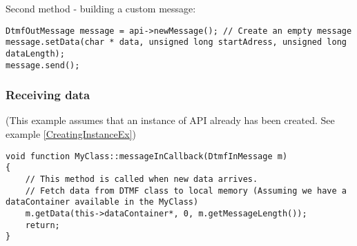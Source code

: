 Second method - building a custom message:
\begin{lstlisting}[float=htb,language={[ANSI]C++},caption={Sending data example 2},label=SendingDataEx2]
DtmfOutMessage message = api->newMessage(); // Create an empty message
message.setData(char * data, unsigned long startAdress, unsigned long dataLength);
message.send();
\end{lstlisting}

\subsubsection{Receiving data}
(This example assumes that an instance of API already has been created. See example \ref{CreatingInstanceEx})
\begin{lstlisting}[float=htb,language={[ANSI]C++},caption={Receiving data example},label=ReceivingDataEx]
void function MyClass::messageInCallback(DtmfInMessage m)
{
    // This method is called when new data arrives.
    // Fetch data from DTMF class to local memory (Assuming we have a dataContainer available in the MyClass)
    m.getData(this->dataContainer*, 0, m.getMessageLength());
    return;
}
\end{lstlisting}
